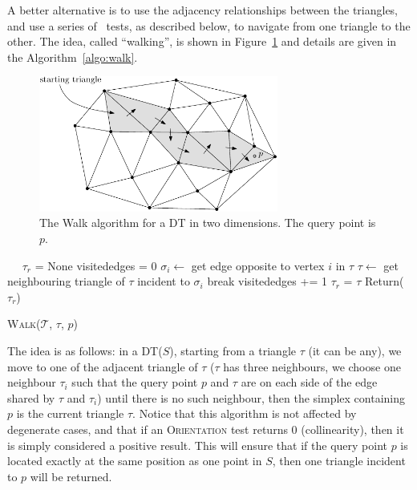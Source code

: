 A better alternative is to use the adjacency relationships between the triangles, and use a series of \Orient\ tests, as described below, to navigate from one triangle to the other. 
The idea, called ``walking'', is shown in Figure~\ref{fig:walk} and details are given in the Algorithm~\ref{algo:walk}.
\begin{figure}
  \centering
  \includegraphics[width=0.7\textwidth]{walk}
  \caption{The Walk algorithm for a DT in two dimensions. The query point is $p$.}%
\label{fig:walk}
\end{figure}
\begin{algorithm}[t]
  \DontPrintSemicolon\
  \KwOut{$\tau_r$: the triangle in $\mathcal{T}$ containing $p$}
  \BlankLine\ 
  $\tau_r$ = None\;
  {
    visitededges = 0\;
    {
      $\sigma_i \leftarrow$ get edge opposite to vertex $i$ in $\tau$\;
      {
        $\tau \leftarrow$ get neighbouring triangle of $\tau$ incident to $\sigma_i$\;
        break\;
      }
      visitededges += 1\;
    }  
    {
      $\tau_r$ = $\tau$\;
    }
  }
  Return($\tau_r$)
  \caption{W\textsc{alk}($\mathcal{T}$, $\tau$, $p$)}%
\label{algo:walk}
\end{algorithm}
The idea is as follows: in a DT($S$), starting from a triangle $\tau$ (it can be any), we move to one of the adjacent triangle of $\tau$ ($\tau$ has three neighbours, we choose one neighbour $\tau_i$ such that the query point $p$ and $\tau$ are on each side of the edge shared by $\tau$ and $\tau_i$) until there is no such neighbour, then the simplex containing $p$ is the current triangle $\tau$.
Notice that this algorithm is not affected by degenerate cases, and that if an \textrm{O}\textsc{rientation} test returns 0 (collinearity), then it is simply considered a positive result. 
This will ensure that if the query point $p$ is located exactly at the same position as one point in $S$, then one triangle incident to $p$ will be returned.


